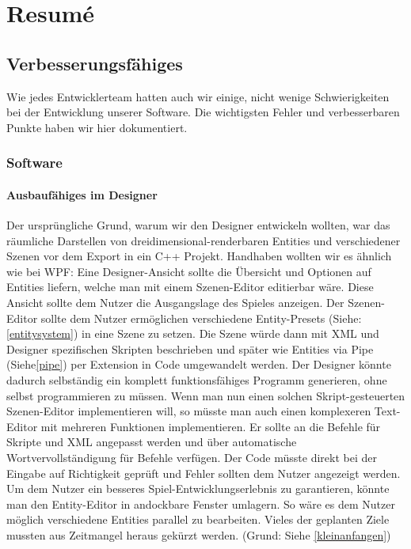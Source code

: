 \chapter{Resumé}

\section{Verbesserungsfähiges}
 Wie jedes Entwicklerteam hatten auch wir einige, nicht wenige Schwierigkeiten bei der Entwicklung unserer Software. Die wichtigsten Fehler und verbesserbaren Punkte haben wir hier dokumentiert.

\subsection{Software}
\subsubsection{Ausbaufähiges im Designer}
Der ursprüngliche Grund, warum wir den Designer entwickeln wollten, war das räumliche Darstellen von dreidimensional-renderbaren Entities und verschiedener Szenen vor dem Export in ein C++ Projekt. Handhaben wollten wir es ähnlich wie bei WPF: Eine Designer-Ansicht sollte die Übersicht und Optionen auf Entities liefern, welche man mit einem Szenen-Editor editierbar wäre. Diese Ansicht sollte dem Nutzer die Ausgangslage des Spieles anzeigen.
Der Szenen-Editor sollte dem Nutzer ermöglichen verschiedene Entity-Presets (Siehe: \cref{entitysystem}) in eine Szene zu setzen. Die Szene würde dann mit XML und Designer spezifischen Skripten beschrieben und später wie Entities via Pipe (Siehe\cref{pipe}) per Extension in Code umgewandelt werden.
Der Designer könnte dadurch selbständig ein komplett funktionsfähiges Programm generieren, ohne selbst programmieren zu müssen.
Wenn man nun einen solchen Skript-gesteuerten Szenen-Editor implementieren will, so müsste man auch einen komplexeren Text-Editor mit mehreren Funktionen implementieren. Er sollte an die Befehle für Skripte und XML angepasst werden und über automatische Wortvervollständigung für Befehle verfügen. Der Code müsste direkt bei der Eingabe auf Richtigkeit geprüft und Fehler sollten dem Nutzer angezeigt werden.
Um dem Nutzer ein besseres Spiel-Entwicklungserlebnis zu garantieren, könnte man den Entity-Editor in andockbare Fenster umlagern. So wäre es dem Nutzer möglich verschiedene Entities parallel zu bearbeiten.
Vieles der geplanten Ziele mussten aus Zeitmangel heraus gekürzt werden. (Grund: Siehe \cref{kleinanfangen})
	
